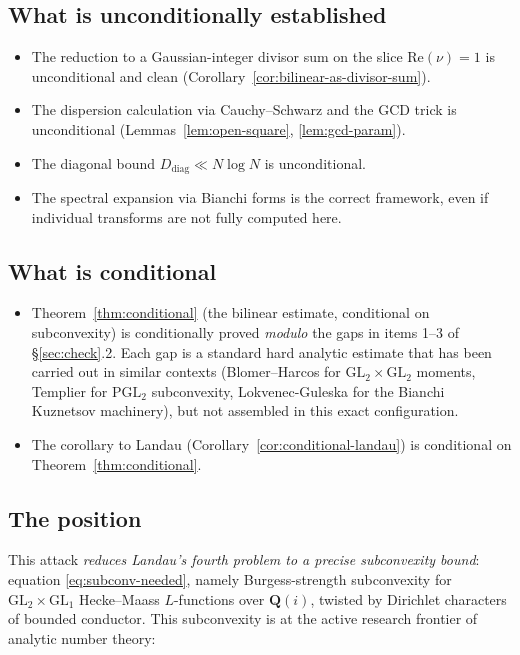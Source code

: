 \documentclass[11pt]{article}
\theoremstyle{definition}
\newcommand{\Q}{\mathbf{Q}}
\newcommand{\Re}{\mathrm{Re}}
\renewcommand{\Re}{\mathrm{Re}}
\begin{document}
\subsection{What is unconditionally established}

\begin{itemize}
\item The reduction to a Gaussian-integer divisor sum on the slice $\Re(\nu)=1$ is unconditional and clean (Corollary~\ref{cor:bilinear-as-divisor-sum}).
\item The dispersion calculation via Cauchy--Schwarz and the GCD trick is unconditional (Lemmas~\ref{lem:open-square}, \ref{lem:gcd-param}).
\item The diagonal bound $D_{\mathrm{diag}}\ll N\log N$ is unconditional.
\item The spectral expansion via Bianchi forms is the correct framework, even if individual transforms are not fully computed here.
\end{itemize}

\subsection{What is conditional}

\begin{itemize}
\item Theorem~\ref{thm:conditional} (the bilinear estimate, conditional on subconvexity) is conditionally proved \emph{modulo} the gaps in items 1--3 of \S\ref{sec:check}.2. Each gap is a standard hard analytic estimate that has been carried out in similar contexts (Blomer--Harcos for $\mathrm{GL}_2\times\mathrm{GL}_2$ moments, Templier for $\mathrm{PGL}_2$ subconvexity, Lokvenec-Guleska for the Bianchi Kuznetsov machinery), but not assembled in this exact configuration.
\item The corollary to Landau (Corollary~\ref{cor:conditional-landau}) is conditional on Theorem~\ref{thm:conditional}.
\end{itemize}

\subsection{The position}

This attack \emph{reduces Landau's fourth problem to a precise subconvexity bound}: equation \eqref{eq:subconv-needed}, namely Burgess-strength subconvexity for $\mathrm{GL}_2\times\mathrm{GL}_1$ Hecke--Maass $L$-functions over $\Q(i)$, twisted by Dirichlet characters of bounded conductor. This subconvexity is at the active research frontier of analytic number theory:
\end{document}
